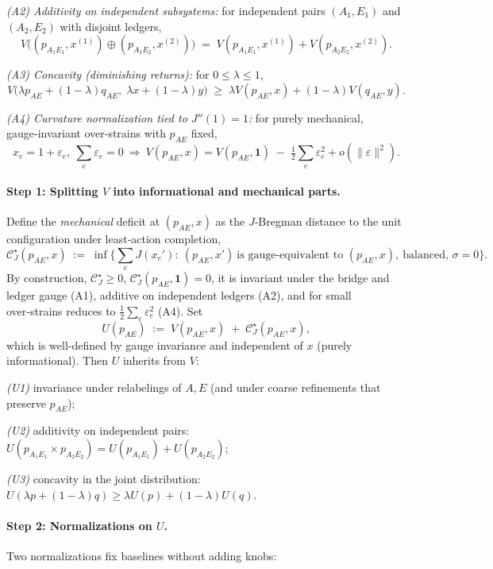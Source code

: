 \documentclass[11pt]{article}
\begin{document}
\emph{(A2) Additivity on independent subsystems:} for independent pairs $(A_1,E_1)$ and $(A_2,E_2)$ with disjoint ledgers,
\[
V\big((p_{A_1E_1},x^{(1)})\oplus(p_{A_2E_2},x^{(2)})\big)
\;=\;V(p_{A_1E_1},x^{(1)})+V(p_{A_2E_2},x^{(2)}).
\]

\emph{(A3) Concavity (diminishing returns):} for $0\le \lambda\le 1$,
\[
V\big(\lambda p_{AE}+(1-\lambda)q_{AE},\;\lambda x+(1-\lambda)y\big)
\;\ge\;\lambda V(p_{AE},x)+(1-\lambda)V(q_{AE},y).
\]

\emph{(A4) Curvature normalization tied to $J''(1)=1$:} for purely mechanical, gauge‑invariant over‑strains with $p_{AE}$ fixed,
\[
x_e=1+\varepsilon_e,\ \sum_e \varepsilon_e=0
\ \Rightarrow\
V(p_{AE},x)=V(p_{AE},\mathbf 1)\;-\;\tfrac12\sum_e \varepsilon_e^2+o(\|\varepsilon\|^2).
\]

\paragraph{Step 1: Splitting $V$ into informational and mechanical parts.}
Define the \emph{mechanical} deficit at $(p_{AE},x)$ as the $J$‑Bregman distance to the unit configuration under least‑action completion,
\[
\mathcal{C}_J^\star(p_{AE},x)
\;:=\;
\inf\Big\{\sum_{e}J(x_e'):\ (p_{AE},x')\ \text{is gauge‑equivalent to }(p_{AE},x),\ \text{balanced, }\sigma=0\Big\}.
\]
By construction, $\mathcal{C}_J^\star\ge 0$, $\mathcal{C}_J^\star(p_{AE},\mathbf 1)=0$, it is invariant under the bridge and ledger gauge (A1), additive on independent ledgers (A2), and for small over‑strains reduces to $\tfrac12\sum_e \varepsilon_e^2$ (A4). Set
\[
U(p_{AE})\;:=\;V(p_{AE},x)\;+\;\mathcal{C}_J^\star(p_{AE},x),
\]
which is well-defined by gauge invariance and independent of $x$ (purely informational). Then $U$ inherits from $V$:

\emph{(U1)} invariance under relabelings of $A,E$ (and under coarse refinements that preserve $p_{AE}$);

\emph{(U2)} additivity on independent pairs: $U(p_{A_1E_1}\times p_{A_2E_2})=U(p_{A_1E_1})+U(p_{A_2E_2})$;

\emph{(U3)} concavity in the joint distribution: $U(\lambda p+(1-\lambda)q)\ge \lambda U(p)+(1-\lambda)U(q)$.

\paragraph{Step 2: Normalizations on $U$.}
Two normalizations fix baselines without adding knobs:
\end{document}
